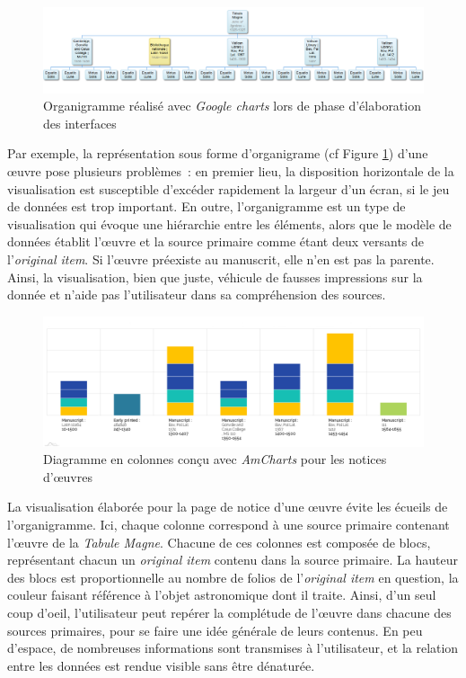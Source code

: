 \documentclass[a4paper,12pt,twoside]{book}
\newcommand{\eng}{\emph}
\newcommand{\oi}{\eng{original item}\xspace}
\begin{document}
\begin{figure}[H]
	\centering
	\includegraphics[width=16cm]{Images/Visualisations/Premiers-essais/Work-organigramme.png}
	\caption{Organigramme réalisé avec \eng{Google charts} lors de phase d'élaboration des interfaces\label{Organigramme}}
\end{figure}

Par exemple, la représentation sous forme d'organigrame (cf Figure \ref{Organigramme}) d'une œuvre pose plusieurs problèmes~: en premier lieu, la disposition horizontale de la visualisation est susceptible d'excéder rapidement la largeur d'un écran, si le jeu de données est trop important. En outre, l'organigramme est un type de visualisation qui évoque une hiérarchie entre les éléments, alors que le modèle de données établit l'œuvre et la source primaire comme étant deux versants de l'\oi. Si l'œuvre préexiste au manuscrit, elle n'en est pas la parente. Ainsi, la visualisation, bien que juste, véhicule de fausses impressions sur la donnée et n'aide pas l'utilisateur dans sa compréhension des sources.

\begin{figure}[H]
	\centering
	\includegraphics[width=16cm]{Images/Visualisations/Work-Tabule_Magne.png}
	\caption{Diagramme en colonnes conçu avec \eng{AmCharts} pour les notices d'œuvres}
\end{figure}

La visualisation élaborée pour la page de notice d'une œuvre évite les écueils de l'organigramme. Ici, chaque colonne correspond à une source primaire contenant l'œuvre de la \emph{Tabule Magne}. Chacune de ces colonnes est composée de blocs, représentant chacun un \oi contenu dans la source primaire. La hauteur des blocs est proportionnelle au nombre de folios de l'\oi en question, la couleur faisant référence à l'objet astronomique dont il traite. Ainsi, d'un seul coup d'oeil, l'utilisateur peut repérer la complétude de l'œuvre dans chacune des sources primaires, pour se faire une idée générale de leurs contenus. En peu d'espace, de nombreuses informations sont transmises à l'utilisateur, et la relation entre les données est rendue visible sans être dénaturée.
\end{document}
